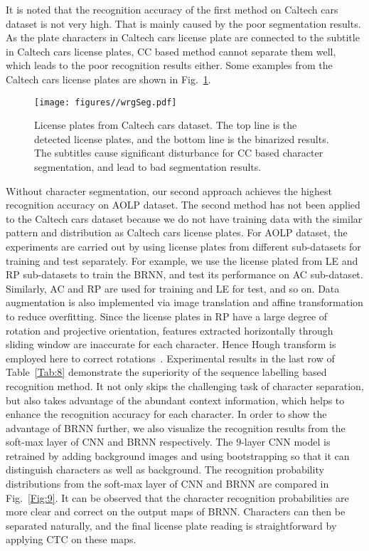 \documentclass[twocolumn]{svjour3}
\begin{document}
It is noted that the recognition accuracy of the first method on Caltech cars dataset is not very high. That is mainly caused by the poor segmentation results. As the plate characters in Caltech cars license plate are  connected to the subtitle in Caltech cars license plates, CC based method cannot separate them well, which leads to the poor recognition results either. Some examples from the Caltech cars license plates are shown in Fig.~\ref{Fig:6}.

\begin{figure}[tb]
\centering
\texttt{[image: figures//wrgSeg.pdf]}
\caption{License plates from Caltech cars dataset. The top line is the detected license plates, and the bottom line is the binarized results. The subtitles cause significant disturbance for CC based character segmentation, and lead to bad segmentation results.}
\label{Fig:6}
\end{figure}Without character segmentation, our second approach achieves the highest recognition accuracy on AOLP dataset. The second method has not been applied to the Caltech cars dataset because we do not have training data with the similar pattern and distribution as Caltech cars license plates. For AOLP dataset, the experiments are carried out by using license plates from different sub-datasets for training and test separately. For example, we use the license plated from LE and RP sub-datasets to train the BRNN, and test its performance on AC sub-dataset. Similarly, AC and RP are used for training and LE for test, and so on.
Data augmentation is also implemented via image translation and affine transformation to reduce overfitting. Since the license plates in RP have a large degree of rotation and projective orientation, features extracted horizontally through sliding window are inaccurate for each character. Hence Hough transform is employed here to correct rotations~\cite{Rasheed2012}. Experimental results in the last row of Table~\ref{Tab:8} demonstrate the superiority of the sequence labelling based recognition method. It not only skips the challenging task of character separation, but also takes advantage of the abundant context information, which helps to enhance the recognition accuracy for each character. %
In order to show the advantage of BRNN further, we also visualize the recognition results from the soft-max layer of CNN and BRNN respectively. The $9$-layer CNN model is retrained by adding background images and using bootstrapping so that it can distinguish characters as well as background. The recognition probability distributions from the soft-max layer of CNN and BRNN are compared in Fig.~\ref{Fig:9}. %
It can be observed that the character recognition probabilities are more clear and correct on the output maps of BRNN. Characters can then be separated naturally, and the final license plate reading is straightforward by applying CTC on these maps.
\end{document}
